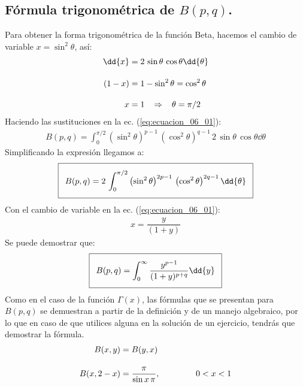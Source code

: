 \subsection{Fórmula trigonométrica de \texorpdfstring{$B(p,q)$}{B(p, q)}.}

Para obtener la forma trigonométrica de la función Beta, hacemos el cambio de variable $x = \sin^{2} \theta$, así:
\begin{align*}
\dd{x} &= 2 \, \sin \theta \, \cos \theta \dd{\theta} \\[1em]
(1 - x) &= 1 - \sin^{2} \theta = \cos^{2} \theta \\[1em]
x &= 1 \hspace{0.3cm} \Rightarrow \hspace{0.3cm} \theta = \pi/2
\end{align*}
Haciendo las sustituciones en la ec. (\ref{eq:ecuacion_06_01}):
{\fontsize{12}{12}\selectfont
\begin{align}
B(p, q) = \int_{0}^{\pi/2} \left( \sin^{2} \theta \right)^{p-1} \, \left( \cos^{2} \theta \right)^{q-1} \, 2 \, \sin \theta \, \cos \theta \dd{\theta}
\end{align}}
Simplificando la expresión llegamos a:
{\fontsize{12}{12}\selectfont
\begin{align}
\addtolength{\fboxsep}{5pt}\boxed{B(p, q) = 2 \, \int_{0}^{\pi/2} \left( \sin^{2} \theta \right)^{2p-1} \, \left( \cos^{2} \theta \right)^{2q-1} \dd{\theta}}
\label{eq:ecuacion_06_04}
\end{align}}
Con el cambio de variable en la ec. (\ref{eq:ecuacion_06_01}):
\begin{align*}
x = \dfrac{y}{(1 + y)}
\end{align*}
Se puede demostrar que:
\begin{align}
\addtolength{\fboxsep}{5pt}\boxed{B(p, q) = \int_{0}^{\infty} \dfrac{y^{p-1}}{(1 + y)^{p+q}} \dd{y}}
\label{eq:ecuacion_06_05}
\end{align}   
Como en el caso de la función $\Gamma (x)$, las fórmulas que se presentan para $B(p, q)$ se demuestran a partir de la definición y de un manejo algebraico, por lo que en caso de que utilices alguna en la solución de un ejercicio, tendrás que demostrar la fórmula.
\begin{align*}
B (x, y) &= B (y, x) \\[1em]
B (x, 2-x) &= \dfrac{\pi}{\sin x \, \pi}, \hspace{1.5cm} 0 < x < 1   
\end{align*}

